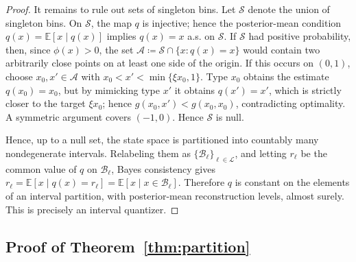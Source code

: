\documentclass[journal,twoside,web]{ieeecolor}
\begin{document}
\begin{proof}
    It remains to rule out sets of singleton bins. Let
    $\mathcal S$ denote the union of singleton bins. On $\mathcal S$, the map $q$
    is injective; hence the posterior-mean condition $q(x)=\mathbb E[x\mid q(x)]$
    implies $q(x)=x$ a.s. on $\mathcal S$. If $\mathcal S$ had positive
    probability, then, since $\phi(x)>0$, the set
    $\mathcal A\coloneqq\mathcal S\cap\{x:q(x)=x\}$ would contain two arbitrarily
    close points on at least one side of the origin. If this occurs on $(0,1)$,
    choose $x_0,x'\in\mathcal A$ with $x_0<x'<\min\{\xi x_0,1\}$. Type $x_0$
    obtains the estimate $q(x_0)=x_0$, but by mimicking type $x'$ it obtains
    $q(x')=x'$, which is strictly closer to the target $\xi x_0$; hence
    $g(x_0,x')<g(x_0,x_0)$, contradicting optimality. A symmetric
    argument covers $(-1,0)$.
    Hence $\mathcal S$ is null.

    Hence, up to a null set, the state space is partitioned into countably
    many nondegenerate intervals. Relabeling them as
    $\{\mathcal B_\ell\}_{\ell\in\mathcal L}$, and letting $r_\ell$ be the common value
    of $q$ on $\mathcal B_\ell$, Bayes consistency gives
    $r_\ell=\mathbb E[x\mid q(x)=r_\ell]=\mathbb E[x\mid x\in\mathcal B_\ell]$.
    Therefore $q$ is constant on the elements of an interval partition,
    with posterior-mean reconstruction levels, almost surely. This is precisely
    an interval quantizer.
\end{proof}

\subsection{Proof of Theorem~\ref{thm:partition}}
\label{app:proof_partition}
\end{document}

